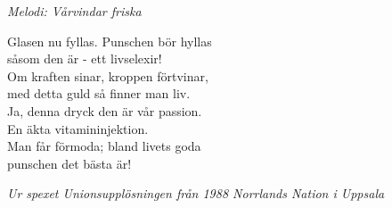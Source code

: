 {\footnotesize\textit{Melodi: Vårvindar friska}}\par
\vspace{10pt}
Glasen nu fyllas. Punschen bör hyllas\\
såsom den är - ett livselexir!\\
Om kraften sinar, kroppen förtvinar,\\
med detta guld så finner man liv.\\
Ja, denna dryck den är vår passion.\\
En äkta vitamininjektion.\\
Man får förmoda; bland livets goda\\
punschen det bästa är!\par
\vspace{10pt}
{\footnotesize\textit{Ur spexet Unionsupplösningen från 1988 Norrlands Nation i Uppsala}}

